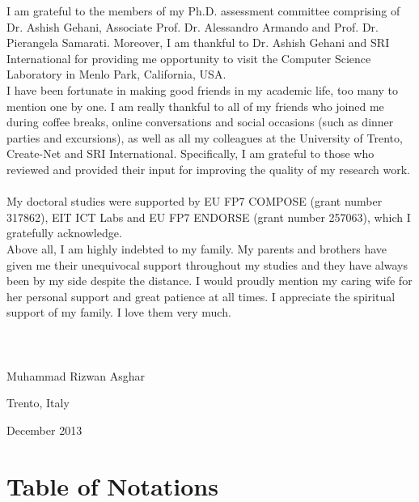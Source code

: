 \documentclass[epsfig,a4paper,11pt,titlepage]{book}
\numberwithin{algorithm}{chapter}
\begin{document}
I am grateful to the members of my Ph.D. assessment committee comprising of Dr. Ashish Gehani, Associate Prof. Dr. Alessandro Armando and Prof. Dr. Pierangela Samarati. Moreover, I am thankful to Dr. Ashish Gehani and SRI International for providing me opportunity to visit the Computer Science Laboratory in Menlo Park, California, USA. \\

I have been fortunate in making good friends in my academic life, too many to mention one by one. I am really thankful to all of my friends who joined me during coffee breaks, online conversations and social occasions (such as dinner parties and excursions), as well as all my colleagues at the University of Trento, Create-Net and SRI International. Specifically, I am grateful to those who reviewed and provided their input for improving the quality of my research work. \\ \\

My doctoral studies were supported by EU FP7 COMPOSE (grant number 317862), EIT ICT Labs and EU FP7 ENDORSE (grant number 257063), which I gratefully acknowledge. \\

Above all, I am highly indebted to my family. My parents and brothers have given me their unequivocal support throughout my studies and they have always been by my side despite the distance. I would proudly mention my caring wife for her personal support and great patience at all times. I appreciate the spiritual support of my family. I love them very much. \\ \\ \\ \\


\hfill Muhammad Rizwan Asghar

\hfill Trento, Italy

\hfill December 2013

\tableofcontents


\listoftables

\listoffigures


\listofalgorithms
{}


\printglossaries


\chapter*{Table of Notations}
\end{document}
